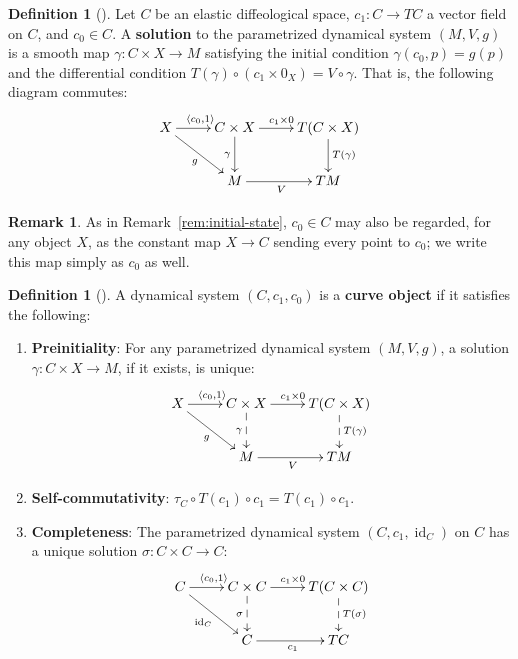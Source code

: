 \documentclass{amsart}
\DeclareMathOperator{\id}{id}
\theoremstyle{definition}
\newtheorem{defn}[thm]{Definition}
\newtheorem{rem}[thm]{Remark}
\begin{document}
\begin{defn}[{\cite[Definition~3.1]{CCL}}]\label{def:parametrized-solution}
  Let $C$ be an elastic diffeological space, $c_1 \colon C \to TC$ a vector field
  on $C$, and $c_0 \in C$. A \textbf{solution} to the parametrized dynamical system
  $(M, V, g)$ is a smooth map $\gamma \colon C \times X \to M$ satisfying
  the initial condition $\gamma(c_0, p) = g(p)$ and the differential condition
  $T(\gamma) \circ (c_1 \times 0_X) = V \circ \gamma$.
  That is, the following diagram commutes:
 \[
   \xymatrix{
     X \ar[r]^{\langle c_0, 1\rangle} \ar[dr]_{g}
       & C \times X \ar[r]^{c_1 \times 0} \ar[d]_{\gamma}
       & T(C \times X) \ar[d]^{T(\gamma)} \\
     & M \ar[r]_{V}
       & TM
   }
 \]
\end{defn}

\begin{rem}\label{rem:point-as-constant-map}
  As in Remark~\ref{rem:initial-state}, $c_0 \in C$ may also be regarded, for
  any object $X$, as the constant map $X \to C$ sending every point to $c_0$;
  we write this map simply as $c_0$ as well.
\end{rem}

\begin{defn}[{\cite[Definition~4.1]{CCL}}]\label{def:curve-object}
  A dynamical system $(C, c_1, c_0)$ is a \textbf{curve object} if it satisfies
  the following:
  \begin{enumerate}
    \item \textbf{Preinitiality}: For any parametrized dynamical system $(M, V, g)$,
      a solution $\gamma \colon C \times X \to M$, if it exists, is unique:
    \[
      \xymatrix{
        X \ar[r]^{\langle c_0, 1\rangle} \ar[dr]_{g}
          & C \times X \ar[r]^{c_1 \times 0} \ar@{-->}[d]_{\gamma}
          & T(C \times X) \ar@{-->}[d]^{T(\gamma)} \\
        & M \ar[r]_{V}
          & TM
      }
    \]
    \item \textbf{Self-commutativity}: $\tau_C \circ T(c_1) \circ c_1
      = T(c_1) \circ c_1$.
    \item \textbf{Completeness}: The parametrized dynamical system
      $(C, c_1, \id_C)$ on $C$ has a unique solution $\sigma \colon C \times C \to C$:
    \[
      \xymatrix{
        C \ar[r]^{\langle c_0, 1\rangle} \ar[dr]_{\id_C}
          & C \times C \ar[r]^{c_1 \times 0} \ar@{-->}[d]_{\sigma}
          & T(C \times C) \ar@{-->}[d]^{T(\sigma)} \\
        & C \ar[r]_{c_1}
          & TC
      }
    \]
  \end{enumerate}
\end{defn}
\end{document}
